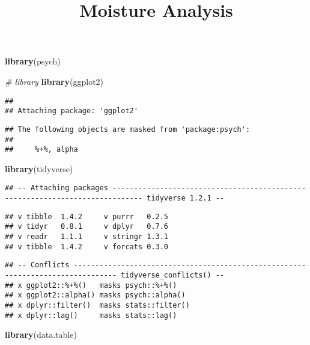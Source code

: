 \documentclass[]{article}
\title{Moisture Analysis}
\author{}
\date{}
\newenvironment{Shaded}{\begin{snugshade}}{\end{snugshade}}
\newcommand{\KeywordTok}[1]{\textcolor[rgb]{0.13,0.29,0.53}{\textbf{#1}}}
\newcommand{\CommentTok}[1]{\textcolor[rgb]{0.56,0.35,0.01}{\textit{#1}}}
\newcommand{\NormalTok}[1]{#1}
\begin{document}
\maketitle

\begin{Shaded}
\begin{Highlighting}[]
\KeywordTok{library}\NormalTok{(psych)}

\CommentTok{# library}
\KeywordTok{library}\NormalTok{(ggplot2)}
\end{Highlighting}
\end{Shaded}

\begin{verbatim}
## 
## Attaching package: 'ggplot2'
\end{verbatim}

\begin{verbatim}
## The following objects are masked from 'package:psych':
## 
##     %+%, alpha
\end{verbatim}

\begin{Shaded}
\begin{Highlighting}[]
\KeywordTok{library}\NormalTok{(tidyverse)}
\end{Highlighting}
\end{Shaded}

\begin{verbatim}
## -- Attaching packages ----------------------------------------------------------------------------- tidyverse 1.2.1 --
\end{verbatim}

\begin{verbatim}
## v tibble  1.4.2     v purrr   0.2.5
## v tidyr   0.8.1     v dplyr   0.7.6
## v readr   1.1.1     v stringr 1.3.1
## v tibble  1.4.2     v forcats 0.3.0
\end{verbatim}

\begin{verbatim}
## -- Conflicts -------------------------------------------------------------------------------- tidyverse_conflicts() --
## x ggplot2::%+%()   masks psych::%+%()
## x ggplot2::alpha() masks psych::alpha()
## x dplyr::filter()  masks stats::filter()
## x dplyr::lag()     masks stats::lag()
\end{verbatim}

\begin{Shaded}
\begin{Highlighting}[]
\KeywordTok{library}\NormalTok{(data.table)}
\end{Highlighting}
\end{Shaded}
\end{document}
